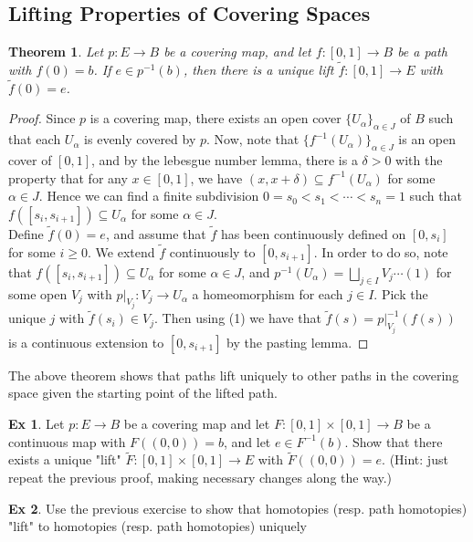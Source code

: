\documentclass[10pt, openany]{book}
\theoremstyle{plain}
\newtheorem{theorem}{Theorem}[section]
\theoremstyle{definition}
\newtheorem{exercise}{Ex}[section]
\theoremstyle{remark}
\begin{document}
\subsection{Lifting Properties of Covering Spaces}
\begin{theorem}
  Let $p: E\rightarrow B$ be a covering map, and let $f: [0,1]\rightarrow B$ be a path with $f(0) = b$. If $e\in p^{-1}(b)$, then there is a unique lift $\tilde{f}:[0,1]\rightarrow E$ with $\tilde{f}(0) = e$.
\end{theorem}
\begin{proof}
  Since $p$ is a covering map, there exists an open cover $\{U_{\alpha}\}_{\alpha\in J}$ of $B$ such that each $U_{\alpha}$ is evenly covered by $p$. Now, note that $\{f^{-1}(U_{\alpha})\}_{\alpha\in J}$ is an open cover of $[0,1]$, and by the lebesgue number lemma, there is a $\delta > 0$ with the property that for any $x\in [0,1]$, we have $(x, x+\delta) \subseteq f^{-1}(U_\alpha)$ for some $\alpha\in J$. Hence we can find a finite subdivision $0=s_0 < s_1 < \cdots < s_n = 1$ such that $f([s_i, s_{i+1}])\subseteq U_{\alpha}$ for some $\alpha\in J$.\\

  Define $\tilde{f}(0) = e$, and assume that $\tilde{f}$ has been continuously defined on $[0,s_i]$ for some $i\geq 0$. We extend $\tilde{f}$ continuously to $[0,s_{i+1}]$. In order to do so, note that $f([s_i,s_{i+1}])\subseteq U_{\alpha}$ for some $\alpha\in J$, and $p^{-1}(U_{\alpha}) = \bigsqcup_{j\in I}V_j\cdots (1)$ for some open $V_j$ with $p|_{V_j}: V_j\rightarrow U_\alpha$ a homeomorphism for each $j\in I$. Pick the unique $j$ with $\tilde{f}(s_i)\in V_j$. Then using (1) we have that $\tilde{f}(s) = p|_{V_j}^{-1}(f(s))$ is a continuous extension to $[0,s_{i+1}]$ by the pasting lemma.
\end{proof}
The above theorem shows that paths lift uniquely to other paths in the covering space given the starting point of the lifted path.
\begin{exercise}
  Let $p : E\rightarrow B$ be a covering map and let $F: [0,1]\times [0,1]\rightarrow B$ be a continuous map with $F((0,0)) = b$, and let $e\in F^{-1}(b)$. Show that there exists a unique "lift" $\tilde{F}:[0,1]\times [0,1]\rightarrow E$ with $\tilde{F}((0,0)) = e$. (Hint: just repeat the previous proof, making necessary changes along the way.)
\end{exercise}
\begin{exercise}
  Use the previous exercise to show that homotopies (resp. path homotopies) "lift" to  homotopies (resp. path homotopies) uniquely
\end{exercise}
\end{document}
